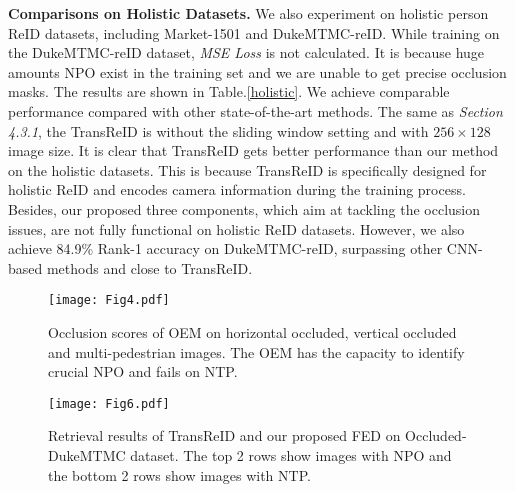 \documentclass[10pt,twocolumn,letterpaper]{article}
\begin{document}
\textbf{Comparisons on Holistic Datasets.}
We also experiment on holistic person ReID datasets, including Market-1501 and DukeMTMC-reID. While training on the DukeMTMC-reID dataset, \emph{MSE Loss} is not calculated. It is because huge amounts NPO exist in the training set and we are unable to get precise occlusion masks. 
The results are shown in Table.\ref{holistic}. We achieve comparable performance compared with other state-of-the-art methods.
The same as \emph{Section 4.3.1}, the TransReID is without the sliding window setting and with $256 \times 128$ image size. It is clear that TransReID gets better performance than our method on the holistic datasets. This is because TransReID is specifically designed for holistic ReID and encodes camera information during the training process. Besides, our proposed three components, which aim at tackling the occlusion issues, are not fully functional on holistic ReID datasets. However, we also achieve 84.9\% Rank-1 accuracy on DukeMTMC-reID, surpassing other CNN-based methods and close to TransReID. 

\begin{figure}
  \centering
   \texttt{[image: Fig4.pdf]}
   \caption{Occlusion scores of OEM on horizontal occluded, vertical occluded and multi-pedestrian images. The OEM has the capacity to identify crucial NPO and fails on NTP.}
   \label{Fig4}
\end{figure}

\begin{figure*}
  \centering
   \texttt{[image: Fig6.pdf]}
   \caption{Retrieval results of TransReID and our proposed FED on Occluded-DukeMTMC dataset. The top 2 rows show images with NPO and the bottom 2 rows show images with NTP.}
   \label{Fig6}
\end{figure*}
\end{document}
